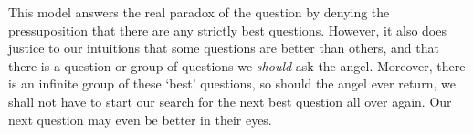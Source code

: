 This model answers the real paradox of the question by denying the pressuposition that there are any strictly best questions.
However, it also does justice to our intuitions that some questions are better than others, and that there is a question or group of questions we \emph{should} ask the angel.
Moreover, there is an infinite group of these `best' questions, so should the angel ever return, we shall not have to start our search for the next best question all over again.
Our next question may even be better in their eyes.
